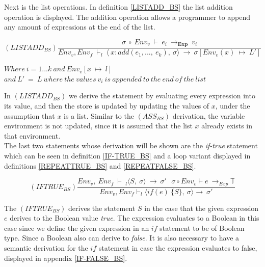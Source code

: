 Next is the list operations. In definition \ref{LISTADD_BS} the list addition operation is displayed. The addition operation allows a programmer to append any amount of expressions at the end of the list. 

\begin{equation} \label{LISTADD_BS}
    (LISTADD_{BS})\frac{\sigma \ \circ \ Env_v \ \vdash \ e_i \ \rightarrow _{\textbf{Exp}} \ v_i}
    {Env_v, Env_f \ \vdash _l \ \langle \ x:add(e_1, ... , \ e_k), \ \sigma \rangle \ \rightarrow \ \sigma[Env_v(x) \ \mapsto \ L']}
\end{equation}
\begin{center}
$Where \ i = 1...k \ and  \ Env_v[x \ \mapsto \ l]$ \\
$and \ L' \ = \ L \ where \ the \ values \ v_i \ is \ appended \ to \ the \ end \ of \ the \ list$ \\
\end{center}


\noindent In $(LISTADD_{BS})$ we derive the statement by evaluating every expression into its value, and then the store is updated by updating the values of $x$, under the assumption that $x$ is a list. Similar to the $(ASS_{BS})$ derivation, the variable environment is not updated, since it is assumed that the list $x$ already exists in that environment. \\

The last two statements whose derivation will be shown are the \textit{if-true} statement which can be seen in definition \ref{IF-TRUE_BS} and a loop variant displayed in definitions \ref{REPEATTRUE_BS} and \ref{REPEATFALSE_BS}.

\begin{equation} \label{IF-TRUE_BS}
    (IFTRUE_{BS})\frac{Env_v,\ Env_f\ \vdash\ _l \langle S,\ \sigma \rangle\ \rightarrow\ \sigma '\ \ \ \sigma \circ Env_v \vdash e \ \rightarrow_{Exp} \mathbb{T}}{Env_v, Env_f \vdash _l \langle if (e)\ \lbrace S \rbrace , \ \sigma \rangle \rightarrow\ \sigma '}
\end{equation}

\noindent The $(IFTRUE_{BS})$ derives the statement 
$S$ in the case that the given expression $e$ derives to the Boolean value \textit{true}. The expression evaluates to a Boolean in this case since we define the given expression in an $if$ statement to be of Boolean type.
Since a Boolean also can derive to \textit{false}. It is also necessary to have a semantic derivation for the $if$ statement in case the expression evaluates to false, displayed in appendix \ref{IF-FALSE_BS}. \\

